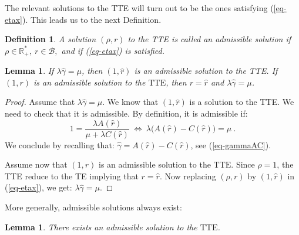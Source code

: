 \documentclass[11pt,a4paper]{article}
\newtheorem{lemma}[theorem]{Lemma}
\newtheorem{definition}[theorem]{Definition}
\theoremstyle{remark}
\def\Blackboardfont{\mathbb}
\def\cb{\cB}
\def\R{{\Blackboardfont R}}
\def\cB{{\mathcal B}}
\def\iff{\Longleftrightarrow}
\def\eref#1{(\ref{#1})}
\begin{document}
The relevant solutions to the TTE will turn out to be the ones
satisfying \eref{eq-etax}. This leads us to the next
Definition.

\begin{definition}\label{de-admissible}
A solution $(\rho,r)$ to the TTE is called an {\em admissible solution} if
$\rho\in \R_+^*, \ r\in \cb,$ and if \eref{eq-etax} is satisfied.
\end{definition}

\begin{lemma}\label{le-tte2}
If $\lambda\widehat{\gamma}=\mu$, then $(1,\widehat{r})$
is an admissible solution to the TTE.
If $(1,r)$ is an admissible solution to the $\text{TTE}$, then
$r=\widehat{r}$ and $\lambda \widehat{\gamma} = \mu$.
\end{lemma}

\begin{proof}
Assume that $\lambda\widehat{\gamma}=\mu$.
We know that $(1,\widehat{r})$ is a solution to the TTE.
We need to check that it is admissible. By definition, it is
admissible if:
\[
1= \frac{\lambda A(\widehat{r})}{\mu + \lambda
C(\widehat{r})} \ \iff \ \lambda \bigl (A(\widehat{r})
  -C(\widehat{r})\bigr)=\mu \:.
\]
We conclude by recalling that: $\widehat{\gamma}= A(\widehat{r})
  -C(\widehat{r})$, see \eref{eq-gammaAC}.

Assume now that $(1,r)$ is an admissible solution to the $\text{TTE}$.
Since $\rho=1$, the TTE reduce to
the TE implying that  $r=\widehat{r}$. Now replacing $(\rho,r)$ by
$(1, \widehat{r})$ in \eref{eq-etax}, we get:
$\lambda\widehat{\gamma}=\mu$.
\end{proof}

More generally, admissible solutions always exist:

\begin{lemma}\label{le-goodsol}
There exists an admissible solution to the
$\text{TTE}$.
\end{lemma}
\end{document}

